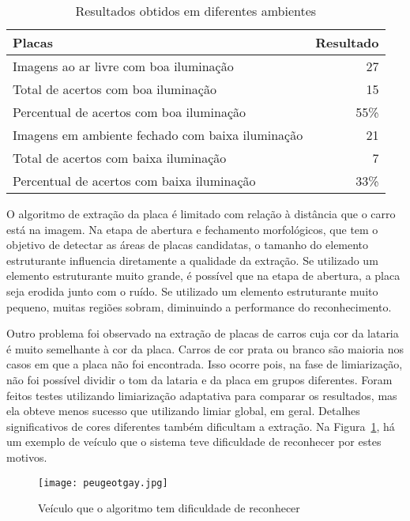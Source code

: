 \begin{table}[]
\centering
\caption{Resultados obtidos em diferentes ambientes}
\label{tab:resultados_ambientes}
\begin{tabular}{@{}lr@{}}
\toprule
Placas                                      		& \multicolumn{1}{l}{Resultado} \\ \midrule
Imagens ao ar livre com boa iluminação     			& 27                            \\
Total de acertos com boa iluminação    			 	& 15                            \\
Percentual de acertos com boa iluminação    		 & 55\%                            \\
Imagens em ambiente fechado com baixa iluminação     & 21                            \\
Total de acertos com baixa iluminação    			 & 7                            \\
Percentual de acertos com baixa iluminação 			& 33\% \\ \bottomrule
\end{tabular}
\end{table}

O algoritmo de extração da placa é limitado com relação à distância que o carro
está na imagem. Na etapa de abertura e fechamento morfológicos, que tem o
objetivo de detectar as áreas de placas candidatas, o tamanho do elemento
estruturante influencia diretamente a qualidade da extração. Se utilizado um
elemento estruturante muito grande, é possível que na etapa de abertura, a placa
seja erodida junto com o ruído. Se utilizado um elemento estruturante muito
pequeno, muitas regiões sobram, diminuindo a performance do reconhecimento.

Outro problema foi observado na extração de placas de carros cuja cor da lataria
é muito semelhante à cor da placa. Carros de cor prata ou branco são maioria nos
casos em que a placa não foi encontrada. Isso ocorre pois, na fase de
limiarização, não foi possível dividir o tom da lataria e da placa em grupos
diferentes. Foram feitos testes utilizando limiarização adaptativa para comparar
os resultados, mas ela obteve menos sucesso que utilizando limiar global, em
geral. Detalhes significativos de cores diferentes também dificultam a extração.
Na Figura~\ref{fig:peugeot_gay}, há um exemplo de veículo que o sistema teve
dificuldade de reconhecer por estes motivos.

\begin{figure}[H]
	\centering
	\texttt{[image: peugeotgay.jpg]}
	\caption{Veículo que o algoritmo tem dificuldade de reconhecer}
	\label{fig:peugeot_gay}
\end{figure}

